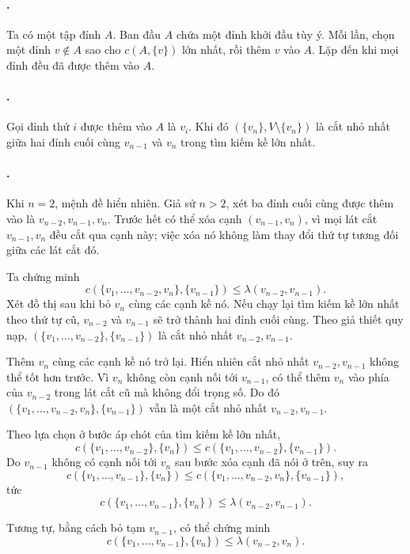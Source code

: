 \documentclass[11pt]{article}
\begin{document}
\paragraph{.}
Ta có một tập đỉnh \(A\). Ban đầu \(A\) chứa một đỉnh khởi đầu tùy ý. Mỗi
lần, chọn một đỉnh \(v\notin A\) sao cho \(c(A,\{v\})\) lớn nhất, rồi thêm
\(v\) vào \(A\). Lặp đến khi mọi đỉnh đều đã được thêm vào \(A\).

\paragraph{.}
Gọi đỉnh thứ \(i\) được thêm vào \(A\) là \(v_i\). Khi đó
\((\{v_n\},V\setminus\{v_n\})\) là cắt nhỏ nhất giữa hai đỉnh cuối cùng
\(v_{n-1}\) và \(v_n\) trong tìm kiếm kề lớn nhất.

\paragraph{.}
Khi \(n=2\), mệnh đề hiển nhiên. Giả sử \(n>2\), xét ba đỉnh cuối cùng được
thêm vào là \(v_{n-2},v_{n-1},v_n\). Trước hết có thể xóa cạnh
\((v_{n-1},v_n)\), vì mọi lát cắt \(v_{n-1},v_n\) đều cắt qua cạnh này; việc
xóa nó không làm thay đổi thứ tự tương đối giữa các lát cắt đó.

Ta chứng minh
\[
  c(\{v_1,\ldots,v_{n-2},v_n\},\{v_{n-1}\})
  \le \lambda(v_{n-2},v_{n-1}).
\]
Xét đồ thị sau khi bỏ \(v_n\) cùng các cạnh kề nó. Nếu chạy lại tìm kiếm kề
lớn nhất theo thứ tự cũ, \(v_{n-2}\) và \(v_{n-1}\) sẽ trở thành hai đỉnh
cuối cùng. Theo giả thiết quy nạp,
\((\{v_1,\ldots,v_{n-2}\},\{v_{n-1}\})\) là cắt nhỏ nhất
\(v_{n-2},v_{n-1}\).

Thêm \(v_n\) cùng các cạnh kề nó trở lại. Hiển nhiên cắt nhỏ nhất
\(v_{n-2},v_{n-1}\) không thể tốt hơn trước. Vì \(v_n\) không còn cạnh nối tới
\(v_{n-1}\), có thể thêm \(v_n\) vào phía của \(v_{n-2}\) trong lát cắt cũ mà
không đổi trọng số. Do đó
\((\{v_1,\ldots,v_{n-2},v_n\},\{v_{n-1}\})\) vẫn là một cắt nhỏ nhất
\(v_{n-2},v_{n-1}\).

Theo lựa chọn ở bước áp chót của tìm kiếm kề lớn nhất,
\[
  c(\{v_1,\ldots,v_{n-2}\},\{v_n\})
  \le c(\{v_1,\ldots,v_{n-2}\},\{v_{n-1}\}).
\]
Do \(v_{n-1}\) không có cạnh nối tới \(v_n\) sau bước xóa cạnh đã nói ở trên,
suy ra
\[
  c(\{v_1,\ldots,v_{n-1}\},\{v_n\})
  \le c(\{v_1,\ldots,v_{n-2},v_n\},\{v_{n-1}\}),
\]
tức
\[
  c(\{v_1,\ldots,v_{n-1}\},\{v_n\})
  \le \lambda(v_{n-2},v_{n-1}).
\]

Tương tự, bằng cách bỏ tạm \(v_{n-1}\), có thể chứng minh
\[
  c(\{v_1,\ldots,v_{n-1}\},\{v_n\})
  \le \lambda(v_{n-2},v_n).
\]
\end{document}

